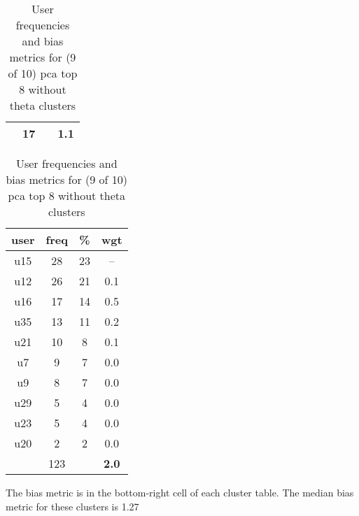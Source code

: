 \begin{appendices}
\begin{table}
\begin{tabular}{ |c|c|c|c| }
	 & 17 & & \textbf{1.1} \\
	\hline
\end{tabular}
\begin{tabular}{ |c|c|c|c| }
	\hline
	\textbf{user} & \textbf{freq} & \textbf{\%} & \textbf{wgt} \\
	\hline
	u15 & 28 & 23 & -- \\
	u12 & 26 & 21 & 0.1 \\
	u16 & 17 & 14 & 0.5 \\
	u35 & 13 & 11 & 0.2 \\
	u21 & 10 & 8 & 0.1 \\
	u7 & 9 & 7 & 0.0 \\
	u9 & 8 & 7 & 0.0 \\
	u29 & 5 & 4 & 0.0 \\
	u23 & 5 & 4 & 0.0 \\
	u20 & 2 & 2 & 0.0 \\
	 & 123 & & \textbf{2.0} \\
	\hline
\end{tabular}
\caption{User frequencies and bias metrics for (9 of 10) pca top 8 without theta clusters}
{\small The bias metric is in the bottom-right cell of each cluster table. The median bias metric for these clusters is 1.27}
\end{table}


\end{appendices}
